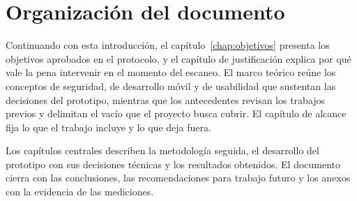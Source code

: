\section{Organización del documento}

Continuando con esta introducción, el capítulo~\ref{chap:objetivos} presenta los objetivos aprobados en el protocolo, y el capítulo de justificación explica por qué vale la pena intervenir en el momento del escaneo. El marco teórico reúne los conceptos de seguridad, de desarrollo móvil y de usabilidad que sustentan las decisiones del prototipo, mientras que los antecedentes revisan los trabajos previos y delimitan el vacío que el proyecto busca cubrir. El capítulo de alcance fija lo que el trabajo incluye y lo que deja fuera.

Los capítulos centrales describen la metodología seguida, el desarrollo del prototipo con sus decisiones técnicas y los resultados obtenidos. El documento cierra con las conclusiones, las recomendaciones para trabajo futuro y los anexos con la evidencia de las mediciones.
